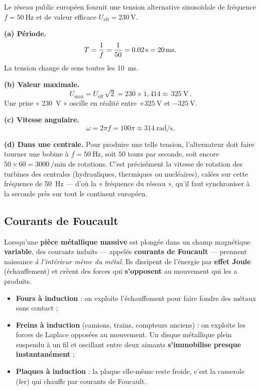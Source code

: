 \documentclass[11pt,a4paper]{article}
\begin{document}
\begin{exemple}
Le réseau public européen fournit une tension alternative sinusoïdale de fréquence
$f=\SI{50}{\hertz}$ et de valeur efficace $U_{\text{eff}}=\SI{230}{\volt}$.

\smallskip
\textbf{(a) Période.}
\[ T = \dfrac{1}{f} = \dfrac{1}{50} = \SI{0{,}02}{\second} = \SI{20}{\milli\second}. \]
La tension change de sens toutes les \SI{10}{\milli\second}.

\textbf{(b) Valeur maximale.}
\[ U_{\max} = U_{\text{eff}}\,\sqrt{2} = 230\times 1{,}414 \approx \boxed{\,\SI{325}{\volt}\,}. \]
Une prise « \SI{230}{\volt} » oscille en réalité entre $+\SI{325}{\volt}$ et $-\SI{325}{\volt}$.

\textbf{(c) Vitesse angulaire.}
\[ \omega = 2\pi f = 100\pi \approx \SI{314}{\radian\per\second}. \]

\textbf{(d) Dans une centrale.} Pour produire une telle tension, l'alternateur doit faire tourner
une bobine à $f=\SI{50}{\hertz}$, soit $50$ tours par seconde, soit encore
$50\times 60=\SI{3000}{\per\minute}$ de rotations. C'est précisément la vitesse de rotation des
turbines des centrales (hydrauliques, thermiques ou nucléaires), calées sur cette fréquence de
\SI{50}{\hertz} — d'où la « fréquence du réseau », qu'il faut synchroniser à la seconde près sur
tout le continent européen.
\end{exemple}

\subsection{Courants de Foucault}

\begin{definition}
Lorsqu'une \textbf{pièce métallique massive} est plongée dans un champ magnétique \textbf{variable},
des courants induits — appelés \textbf{courants de Foucault} — prennent naissance \emph{à l'intérieur
même du métal}. Ils dissipent de l'énergie par \textbf{effet Joule} (échauffement) et créent des
forces qui \textbf{s'opposent} au mouvement qui les a produits.
\end{definition}

\begin{remarque}
\hfill
\begin{itemize}[leftmargin=1.6em,topsep=2pt,itemsep=1pt]
  \item \textbf{Fours à induction} : on exploite l'échauffement pour faire fondre des métaux sans
        contact ;
  \item \textbf{Freins à induction} (camions, trains, compteurs anciens) : on exploite les forces de
        Laplace opposées au mouvement. Un disque métallique plein suspendu à un fil et oscillant
        entre deux aimants \textbf{s'immobilise presque instantanément} ;
  \item \textbf{Plaques à induction} : la plaque elle-même reste froide, c'est la casserole (fer)
        qui chauffe par courants de Foucault.
\end{itemize}
\end{remarque}
\end{document}
